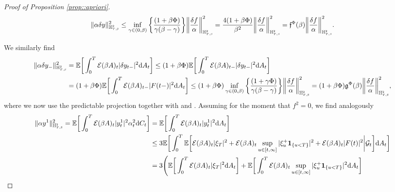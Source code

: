 \documentclass[10pt]{article} %
\newcommand\cE{\mathcal E}
\newcommand\cG{\mathcal G}
\newcommand{\smalltext}[1]{\text{\fontsize{4}{4}\selectfont$#1$}}
\newcommand\ff{\mathfrak f}
\newcommand\fg{\mathfrak g}
\def \E{\mathbb{E}}
\def \H{\mathbb{H}}
\newcommand{\1}{\mathbf{1}}
\def\d{\mathrm{d}}
\begin{document}
\begin{proof}[Proof of Proposition \ref{prop::apriori}]
\begin{equation}\label{eq::inequality_delta_y_H_2}
	\|\alpha \delta y\|^2_{\H^\smalltext{2}_{\smalltext{T}\smalltext{,}\smalltext{\beta}}} 
	\leq \inf_{\gamma \in (0,\beta)}\bigg\{\frac{(1+\beta\Phi)}{\gamma(\beta-\gamma)}\bigg\}\bigg\| \frac{\delta f}{\alpha} \bigg\|^2_{\H^{\smalltext{2}}_{\smalltext{T}\smalltext{,}\smalltext{\beta}}} = \frac{4(1+\beta\Phi)}{\beta^2}\bigg\| \frac{\delta f}{\alpha} \bigg\|^2_{\H^{\smalltext{2}}_{\smalltext{T}\smalltext{,}\smalltext{\beta}}} = \ff^\Phi(\beta) \bigg\| \frac{\delta f}{\alpha} \bigg\|^2_{\H^{\smalltext{2}}_{\smalltext{T}\smalltext{,}\smalltext{\beta}}}.
\end{equation}

We similarly find
\begin{align}
	\|\alpha \delta y_-\|^2_{\H^\smalltext{2}_{\smalltext{T}\smalltext{,}\smalltext{\beta}}} 
	&= \E \bigg[ \int_0^T \cE(\beta A)_t |\delta y_{t-}|^2 \d A_t \bigg] 
\leq (1+\beta\Phi)\E \bigg[ \int_0^T \cE(\beta A)_{t-}|\delta y_{t-}|^2 \d A_t \bigg] \label{eq::exp_minus_y_minus}\\
	&= (1+\beta\Phi)\E \bigg[ \int_0^T \cE(\beta A)_{t-} |F(t-)|^2 \d A_t \bigg]
	\leq (1+\beta\Phi)\inf_{\gamma \in (0,\beta)}\bigg\{\frac{(1+\gamma\Phi)}{\gamma(\beta - \gamma)}\bigg\} \bigg\|\frac{\delta f}{\alpha}\bigg\|^2_{\mathbb{H}^\smalltext{2}_{\smalltext{T}\smalltext{,}\smalltext{\beta}}}
	= (1+\beta\Phi) \fg^\Phi(\beta) \bigg\|\frac{\delta f}{\alpha}\bigg\|^2_{\mathbb{H}^\smalltext{2}_{\smalltext{T}\smalltext{,}\smalltext{\beta}}}, \nonumber
\end{align}
where we now use the predictable projection together with  and  \cite[Theorem VI.57]{dellacherie1982probabilities}. Assuming for the moment that $f^2 = 0$, we find analogously
\begin{align*}
	\|\alpha y^1\|^2_{\H^\smalltext{2}_{\smalltext{T}\smalltext{,}\smalltext{\beta}}} = \E \bigg[ \int_0^T \cE(\beta A)_t |y^1_t|^2 \alpha^2_t \d C_t \bigg] 
	&= \E \bigg[ \int_0^T \cE(\beta A)_t |y^1_{t}|^2 \d A_t \bigg] \\
	&\leq 3\E\bigg[ \int_0^T \E \bigg[\cE(\beta A)_t|\xi_T|^2 + \cE(\beta A)_t\sup_{u \in [t,\infty]}|\xi^+_u \mathbf{1}_{\{u < T\}}|^2 + \cE(\beta A)_t |F(t)|^2 \bigg| \cG_{t} \bigg] \d A_t \bigg] \\
	&= 3\Bigg(\E \bigg[ \int_0^T \cE(\beta A)_t |\xi_T|^2 \d A_t \bigg] + \E \bigg[ \int_0^T \cE(\beta A)_t \sup_{u \in [t,\infty]}|\xi^+_u \mathbf{1}_{\{u < T\}}|^2 \d A_t \bigg] \\

\end{align*}
\end{proof}
\end{document}
